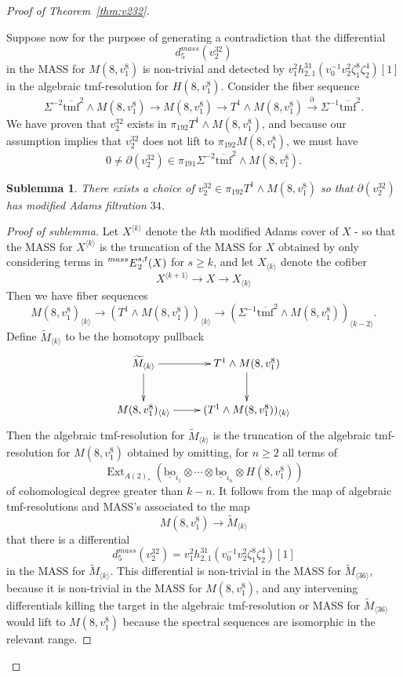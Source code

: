 \documentclass[10pt]{amsart}
\newcommand{\ul}[1]{\underline{#1}}
\newcommand{\bra}[1]{\langle #1 \rangle}
\newcommand{\br}[1]{\overline{#1}}
\newcommand{\td}[1]{\widetilde{#1}}
\newcommand{\tmf}{\mathrm{tmf}}
\newcommand{\bo}{\mathrm{bo}}
\newcommand{\bou}{\ul{\bo}}
\newtheorem{sublem}[equation]{Sublemma}
\theoremstyle{definition}
\numberwithin{equation}{section}
\numberwithin{figure}{section}
\DeclareMathOperator{\Ext}{Ext}
\newcommand{\E}[2]{\prescript{#1}{#2}{E}}
\begin{document}
\begin{proof}[Proof of Theorem~\ref{thm:v232}]
\begin{description}
Suppose now for the purpose of generating a contradiction that the differential
$$ d_5^{mass}(v_2^{32}) $$ 
in the MASS for $M(8,v_1^8)$ is non-trivial and detected by $v_1^2 h_{2,1}^{31}(v_0^{-1}v_2^2\zeta_1^8\zeta_2^4)[1]$ in the algebraic tmf-resolution for $H(8,v_1^8)$.  
Consider the fiber sequence
$$ \Sigma^{-2} \br{\tmf}^{2} \wedge M(8,v_1^8) \rightarrow M(8,v_1^8) \rightarrow T^1 \wedge M(8,v_1^8) \xrightarrow{\partial} \Sigma^{-1} \br{\tmf}^2. $$
We have proven that $v_2^{32}$ exists in $\pi_{192}T^1 \wedge M(8,v_1^8)$, and because our assumption implies that $v_2^{32}$ does not lift to $\pi_{192}M(8,v_1^8)$, we must have
$$ 0 \ne \partial(v_2^{32}) \in \pi_{191}\Sigma^{-2} \br{\tmf}^2 \wedge M(8,v_1^8).
$$
\begin{sublem}
There exists a choice of $v_2^{32} \in \pi_{192}T^1 \wedge M(8,v_1^8)$ so that
$\partial(v_2^{32})$ has modified Adams filtration $34$.
\end{sublem}
\begin{proof}[Proof of sublemma]
Let $X^{\bra{k}}$ denote the $k$th modified Adams cover of $X$ - so that the MASS for $X^{\bra{k}}$ is the truncation of the MASS for $X$ obtained by only considering terms in $\E{mass}{}^{s,t}_2(X)$ for $s \ge k$, and let $X_{\bra{k}}$ denote the cofiber
$$ X^{\bra{k+1}} \rightarrow X \rightarrow X_{\bra{k}} $$ 
Then we have fiber sequences
$$ M(8,v_1^8)_{\bra{k}} \rightarrow (T^1 \wedge M(8,v_1^8))_{\bra{k}} 
\rightarrow (\Sigma^{-1}\br{\tmf}^2 \wedge M(8,v_1^8))_{\bra{k-2}}. $$
Define $\td{M}_{\bra{k}}$ to be the homotopy pullback
$$
\xymatrix{
\td{M}_{\bra{k}} \ar[r] \ar[d] &
T^1 \wedge M(8,v_1^8) \ar[d] \\
M(8,v_1^8)_{\bra{k}} \ar[r] &
(T^1 \wedge M(8,v_1^8))_{\bra{k}}
}
$$
Then the algebraic tmf-resolution for $\td{M}_{\bra{k}}$ is the truncation of the algebraic tmf-resolution for $M(8,v_1^8)$ obtained by omitting, for $n \ge 2$ all terms of
$$ \Ext_{A(2)_*}(\bou_{i_1} \otimes \cdots \otimes \bou_{i_n} \otimes H(8,v_1^8)) $$
of cohomological degree greater than $k-n$.
It follows from the map of algebraic tmf-resolutions and MASS's associated to the map
$$ M(8,v_1^8) \rightarrow \td{M}_{\bra{k}} $$
that there is a differential
$$ d^{mass}_5(v_2^{32}) = v_1^2 h_{2,1}^{31}(v_0^{-1}v_2^2\zeta_1^8\zeta_2^4)[1] $$
in the MASS for $\td{M}_{\bra{k}}$.  This differential is non-trivial in the MASS for $\td{M}_{\bra{36}}$, because it is non-trivial in the MASS for $M(8,v_1^8)$, and any intervening differentials killing the target in the algebraic tmf-resolution or MASS for $\td{M}_{\bra{36}}$ would lift to $M(8,v_1^8)$ because the spectral sequences are isomorphic in the relevant range.

\end{proof}
\end{description}
\end{proof}
\end{document}
